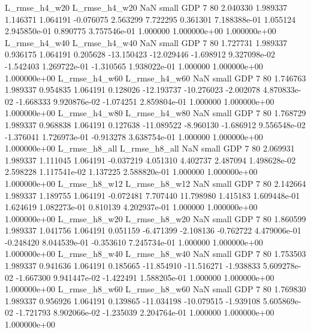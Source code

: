  L_rmse_h4_w20  L_rmse_h4_w20                   NaN      small      GDP                 7 80 2.040330       1.989337 1.146371       1.064191   -0.076075      2.563299      7.722295     0.361301   7.188388e-01  1.055124 2.945850e-01     0.890775   3.757546e-01            1.000000    1.000000e+00        1.000000e+00
 L_rmse_h4_w40  L_rmse_h4_w40                   NaN      small      GDP                 7 80 1.727731       1.989337 0.936175       1.064191    0.205628    -13.150423    -12.029446    -1.698912   9.327098e-02 -1.542403 1.269722e-01    -1.310565   1.938022e-01            1.000000    1.000000e+00        1.000000e+00
 L_rmse_h4_w60  L_rmse_h4_w60                   NaN      small      GDP                 7 80 1.746763       1.989337 0.954835       1.064191    0.128026    -12.193737    -10.276023    -2.002078   4.870833e-02 -1.668333 9.920876e-02    -1.074251   2.859804e-01            1.000000    1.000000e+00        1.000000e+00
 L_rmse_h4_w80  L_rmse_h4_w80                   NaN      small      GDP                 7 80 1.768729       1.989337 0.968838       1.064191    0.127638    -11.089522     -8.960130    -1.686912   9.556548e-02 -1.376041 1.726973e-01    -0.913278   3.638754e-01            1.000000    1.000000e+00        1.000000e+00
 L_rmse_h8_all  L_rmse_h8_all                   NaN      small      GDP                 7 80 2.069931       1.989337 1.111045       1.064191   -0.037219      4.051310      4.402737     2.487094   1.498628e-02  2.598228 1.117541e-02     1.137225   2.588820e-01            1.000000    1.000000e+00        1.000000e+00
 L_rmse_h8_w12  L_rmse_h8_w12                   NaN      small      GDP                 7 80 2.142664       1.989337 1.189755       1.064191   -0.072481      7.707440     11.798980     1.415183   1.609448e-01  1.624619 1.082273e-01     0.810139   4.202937e-01            1.000000    1.000000e+00        1.000000e+00
 L_rmse_h8_w20  L_rmse_h8_w20                   NaN      small      GDP                 7 80 1.860599       1.989337 1.041756       1.064191    0.051159     -6.471399     -2.108136    -0.762722   4.479006e-01 -0.248420 8.044539e-01    -0.353610   7.245734e-01            1.000000    1.000000e+00        1.000000e+00
 L_rmse_h8_w40  L_rmse_h8_w40                   NaN      small      GDP                 7 80 1.753503       1.989337 0.941636       1.064191    0.185665    -11.854910    -11.516271    -1.938833   5.609278e-02 -1.667300 9.941447e-02    -1.422491   1.588205e-01            1.000000    1.000000e+00        1.000000e+00
 L_rmse_h8_w60  L_rmse_h8_w60                   NaN      small      GDP                 7 80 1.769830       1.989337 0.956926       1.064191    0.139865    -11.034198    -10.079515    -1.939108   5.605869e-02 -1.721793 8.902066e-02    -1.235039   2.204764e-01            1.000000    1.000000e+00        1.000000e+00
